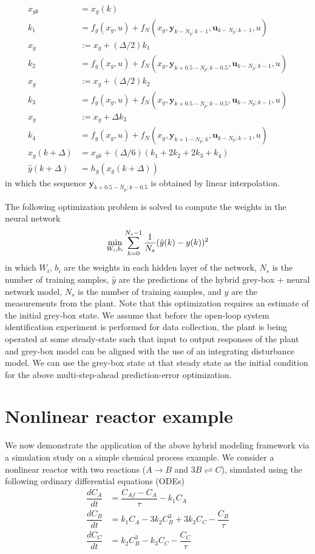 \documentclass{article}
\begin{document}
\begin{align*}
  x_{gk} &= x_g(k) \\
  k_1 &= f_g(x_g, u) + 
  f_N(x_g, \mathbf{y}_{k-N_p:k-1}, \mathbf{u}_{k-N_p:k-1}, u) \\
  x_g & := x_g + (\Delta/2)k_1 \\
  k_2 &= f_g(x_g, u) + 
  f_N(x_g, \mathbf{y}_{k+0.5-N_p:k-0.5}, \mathbf{u}_{k-N_p:k-1}, u)\\
  x_g & := x_g + (\Delta/2)k_2 \\
  k_3 &= f_g(x_g, u) + 
  f_N(x_g, \mathbf{y}_{k+0.5-N_p:k-0.5}, \mathbf{u}_{k-N_p:k-1}, u)\\
  x_g & := x_g + \Delta k_3 \\
  k_4 &= f_g(x_g, u) + 
  f_N(x_g, \mathbf{y}_{k+1-N_p:k}, \mathbf{u}_{k-N_p:k-1}, u)\\
  x_g(k+\Delta) &= x_{gk} + (\Delta/6)(k_1 + 2k_2 + 2k_3 + k_4) \\
  \hat{y}(k+\Delta) &= h_g(x_g(k+\Delta)) 
\end{align*}
in which the sequence $\mathbf{y}_{k+0.5-N_p:k-0.5}$ is obtained by linear
interpolation.

The following optimization problem is solved to compute the weights in the
neural network
\begin{align*}
\underset{W_i, b_i}{\textnormal{min}} \sum_{k=0}^{N_s-1} 
\dfrac{1}{N_s}(\hat{y}(k) - y(k))^2
\end{align*}
in which $W_i$, $b_i$ are the weights in each hidden layer of the network, $N_s$
is the number of training samples, $\hat{y}$ are the predictions of the
hybrid grey-box + neural network model, $N_s$ is the number of training
samples, and $y$ are the measurements from the plant. Note that this
optimization requires an estimate of the initial grey-box state. We assume that
before the open-loop system identification experiment is performed for data
collection, the plant is being operated at some steady-state such that input to
output responses of the plant and grey-box model can be aligned with the use of an
integrating disturbance model. We can use the grey-box state at that steady
state as the initial condition for the above multi-step-ahead prediction-error
optimization.

\section{Nonlinear reactor example}
We now demonstrate the application of the above hybrid modeling framework
via a simulation study on a simple chemical process example. We consider a nonlinear reactor with two reactions ($A \rightarrow B $ and  $3B
\rightleftharpoons C$), simulated using the following ordinary differential
equations (ODEs)
\begin{align*}
  \dfrac{dC_A}{dt} &= \dfrac{C_{Af} - C_A}{\tau} - k_1C_A\\
  \dfrac{dC_B}{dt} &= k_1C_A - 3k_2C^3_B + 3k_3C_C- \dfrac{C_B}{\tau}\\
  \dfrac{dC_C}{dt} &= k_2C^3_B - k_3C_C - \dfrac{C_C}{\tau}
\end{align*}
\end{document}
